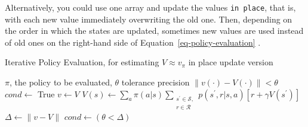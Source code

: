 \documentclass[
  letterpaper,
]{krantz}
\theoremstyle{plain}
\theoremstyle{definition}
\theoremstyle{definition}
\theoremstyle{remark}
\begin{document}
Alternatively, you could use one array and update the values
\texttt{in\ place}, that is, with each new value immediately overwriting
the old one. Then, depending on the order in which the states are
updated, sometimes new values are used instead of old ones on the
right-hand side of Equation~\ref{eq-policy-evaluation} .

\begin{algorithm}[htb!]
    \caption{Iterative Policy Evaluation, for estimating $V \approx v_{\pi}$ 
    in place update version}
    \label{alg-test-text-style}
\begin{algorithmic}[1]
        \Require $\pi$, the policy to be evaluated, $\theta$ tolerance precision
        \Ensure $\|v(\cdot)- V(\cdot)\|< \theta$
            \State $cond \leftarrow$ True
            \State $v \leftarrow V$
                \State $
                        \displaystyle
                        V(s) \leftarrow 
                            \sum_{a}
                                \pi(a|s) 
                                \sum_{
                                    \substack{s^{\prime}\in\mathcal{S},
                                    \\ 
                                    r \in \mathcal{R}}
                                }
                                p(s^{\prime}, r |s ,a)
                                \left[ 
                                    r +\gamma V(s^{\prime})
                                \right]
                    $
            \EndFor
            \State $\Delta \leftarrow \|v -V \|$
            \State $cond \leftarrow (\theta < \Delta)$
        \EndWhile
        \EndProcedure
    \end{algorithmic}
\end{algorithm}
\end{document}
